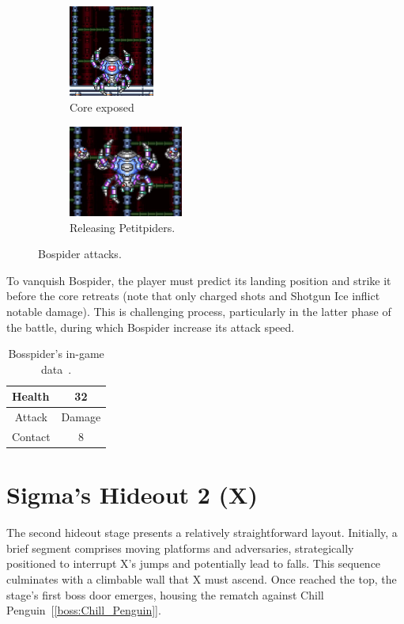 \begin{figure}[htp]
	\centering
	\begin{subfigure}[t]{0.3\linewidth}
		\centering
		\includegraphics[height=3cm]{figures/X1/Sigma_stages/Bospider_core.jpg}
		\caption{Core exposed}
	\end{subfigure}
	\begin{subfigure}[t]{0.32\linewidth}
		\centering
		\includegraphics[height=3cm]{figures/X1/Sigma_stages/Bospider_summon.jpg}
		\caption{Releasing Petitpiders.}
	\end{subfigure}
	\caption{Bospider attacks.}
\end{figure} 

To vanquish Bospider, the player must predict its landing position and strike it before the core retreats (note that only charged shots and Shotgun Ice inflict notable damage). This is challenging process, particularly in the latter phase of the battle, during which Bospider increase its attack speed. 

\begin{table}[htp]
	\centering
	\begin{tabular}[h]{l c}
		\toprule
		Health  & 32\\
		\midrule
		\multicolumn{1}{c}{Attack} & \multicolumn{1}{c}{Damage}\\
		Contact & 8\\
		\bottomrule
	\end{tabular}
	\caption{Bosspider's in-game data~\cite{wiki:Bospider}. }
\end{table}


\section{Sigma's Hideout 2 (X)}
The second hideout stage presents a relatively straightforward layout. Initially, a brief segment comprises moving platforms and adversaries, strategically positioned to interrupt X's jumps and potentially lead to falls. This sequence culminates with a climbable wall that X must ascend. Once reached the top, the stage's first boss door emerges, housing the rematch against Chill Penguin~[\ref{boss:Chill_Penguin}].


